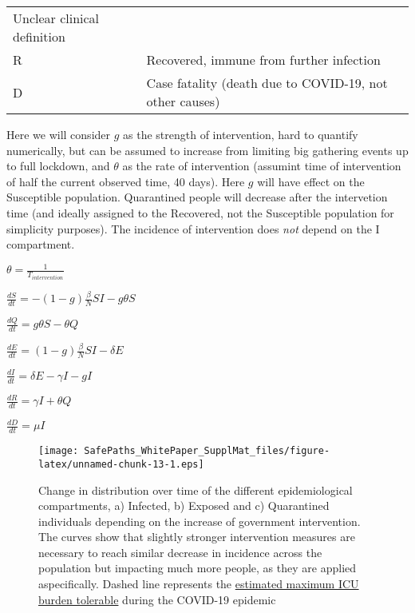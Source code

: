\documentclass[]{article}
\begin{document}
\begin{longtable}[]{@{}ll@{}}
\begin{minipage}[t]{0.83\columnwidth}
Unclear clinical definition\strut
\end{minipage}\tabularnewline
\begin{minipage}[t]{0.11\columnwidth}\raggedright
R\strut
\end{minipage} & \begin{minipage}[t]{0.83\columnwidth}\raggedright
Recovered, immune from further infection\strut
\end{minipage}\tabularnewline
\begin{minipage}[t]{0.11\columnwidth}\raggedright
D\strut
\end{minipage} & \begin{minipage}[t]{0.83\columnwidth}\raggedright
Case fatality (death due to COVID-19, not other causes)\strut
\end{minipage}\tabularnewline
\bottomrule
\end{longtable}

Here we will consider \(g\) as the strength of intervention, hard to
quantify numerically, but can be assumed to increase from limiting big
gathering events up to full lockdown, and \(\theta\) as the rate of
intervention (assumint time of intervention of half the current observed
time, 40 days). Here \(g\) will have effect on the Susceptible
population. Quarantined people will decrease after the intervetion time
(and ideally assigned to the Recovered, not the Susceptible population
for simplicity purposes). The incidence of intervention does \emph{not}
depend on the I compartment.

\(\displaystyle \theta = \frac{1}{T_{intervention}}\)

\(\displaystyle \frac{dS}{dt} = - (1-g)\frac{\beta}{N}SI - g\theta S\)

\(\displaystyle \frac{dQ}{dt} = g\theta S - \theta Q\)

\(\displaystyle \frac{dE}{dt} = (1-g)\frac{\beta}{N}SI - \delta E\)

\(\displaystyle \frac{dI}{dt} = \delta E - \gamma I - gI\)

\(\displaystyle \frac{dR}{dt} = \gamma I + \theta Q\)

\(\displaystyle \frac{dD}{dt} = \mu I\)

\begin{figure}
\centering
\texttt{[image: SafePaths\_WhitePaper\_SupplMat\_files/figure-latex/unnamed-chunk-13-1.eps]}
\caption{Change in distribution over time of the different
epidemiological compartments, a) Infected, b) Exposed and c) Quarantined
individuals depending on the increase of government intervention. The
curves show that slightly stronger intervention measures are necessary
to reach similar decrease in incidence across the population but
impacting much more people, as they are applied aspecifically. Dashed
line represents the
\href{https://www.statnews.com/2020/03/10/simple-math-alarming-answers-covid-19/}{estimated
maximum ICU burden tolerable} during the COVID-19 epidemic}
\end{figure}
\end{document}
